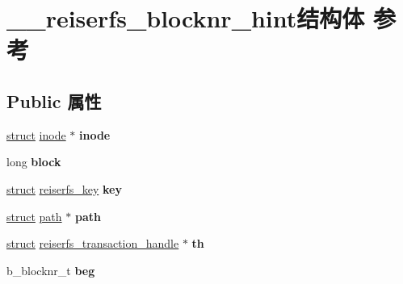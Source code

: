 \hypertarget{struct____reiserfs__blocknr__hint}{}\section{\+\_\+\+\_\+reiserfs\+\_\+blocknr\+\_\+hint结构体 参考}
\label{struct____reiserfs__blocknr__hint}
\subsection*{Public 属性}
\begin{DoxyCompactItemize}
\item 
\mbox{\label{struct____reiserfs__blocknr__hint_abc10e97169be18d92579bb1b2b5d6aae}} 
\hyperlink{interfacestruct}{struct} \hyperlink{structinode}{inode} $\ast$ {\bfseries inode}
\item 
\mbox{\label{struct____reiserfs__blocknr__hint_ac590a38b152b285d69472b760361c5fb}} 
long {\bfseries block}
\item 
\mbox{\label{struct____reiserfs__blocknr__hint_a2500463be799f343aadae127e522a582}} 
\hyperlink{interfacestruct}{struct} \hyperlink{structreiserfs__key}{reiserfs\+\_\+key} {\bfseries key}
\item 
\mbox{\label{struct____reiserfs__blocknr__hint_ad6bc1c74ea381e87d5fc211b7f1f21d8}} 
\hyperlink{interfacestruct}{struct} \hyperlink{structpath}{path} $\ast$ {\bfseries path}
\item 
\mbox{\label{struct____reiserfs__blocknr__hint_a8c37d3c76a5ad5a4e137330ccc587754}} 
\hyperlink{interfacestruct}{struct} \hyperlink{structreiserfs__transaction__handle}{reiserfs\+\_\+transaction\+\_\+handle} $\ast$ {\bfseries th}
\item 
\mbox{\label{struct____reiserfs__blocknr__hint_a9cf6a4f3f5a185bc072aec33a237f26f}} 
b\+\_\+blocknr\+\_\+t {\bfseries beg}
\item 
\mbox{\label{struct____reiserfs__blocknr__hint_acc6f866987fb82f2412a922744bc1e31}} 

\end{DoxyCompactItemize}
